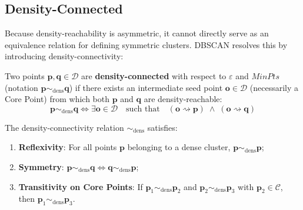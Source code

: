 \subsection{Density-Connected}

Because density-reachability is asymmetric, it cannot directly serve as an equivalence relation for defining symmetric clusters. DBSCAN resolves this by introducing density-connectivity:

\begin{definition}
Two points $\mathbf{p}, \mathbf{q} \in \mathcal{D}$ are \textbf{density-connected} with respect to $\varepsilon$ and $MinPts$ (notation $\mathbf{p} \sim_{\mathrm{dens}} \mathbf{q}$) if there exists an intermediate seed point $\mathbf{o} \in \mathcal{D}$ (necessarily a Core Point) from which both $\mathbf{p}$ and $\mathbf{q}$ are density-reachable:
\begin{equation}
    \mathbf{p} \sim_{\mathrm{dens}} \mathbf{q} \iff \exists \mathbf{o} \in \mathcal{D} \quad \text{such that} \quad (\mathbf{o} \rightsquigarrow \mathbf{p}) \;\land\; (\mathbf{o} \rightsquigarrow \mathbf{q})
    \label{eq:dm-density-connected}
\end{equation}
\end{definition}

\begin{property}
The density-connectivity relation $\sim_{\mathrm{dens}}$ satisfies:
\begin{enumerate}
    \item \textbf{Reflexivity}: For all points $\mathbf{p}$ belonging to a dense cluster, $\mathbf{p} \sim_{\mathrm{dens}} \mathbf{p}$;
    \item \textbf{Symmetry}: $\mathbf{p} \sim_{\mathrm{dens}} \mathbf{q} \iff \mathbf{q} \sim_{\mathrm{dens}} \mathbf{p}$;
    \item \textbf{Transitivity on Core Points}: If $\mathbf{p}_1 \sim_{\mathrm{dens}} \mathbf{p}_2$ and $\mathbf{p}_2 \sim_{\mathrm{dens}} \mathbf{p}_3$ with $\mathbf{p}_2 \in \mathcal{C}$, then $\mathbf{p}_1 \sim_{\mathrm{dens}} \mathbf{p}_3$.
\end{enumerate}
\end{property}

